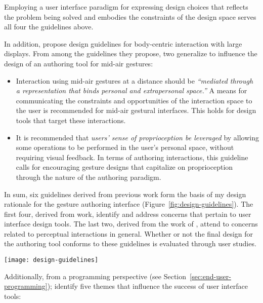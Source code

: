 Employing a user interface paradigm for expressing design choices that reflects the problem being solved and embodies the constraints of the design space \parencite{Norman:1993} serves all four the guidelines above.

In addition, \textcite{Shoemaker:2010} propose design guidelines for body-centric interaction with large displays. From among the guidelines they propose, two generalize to influence the design of an authoring tool for mid-air gestures:

\begin{itemize}
\item Interaction using mid-air gestures at a distance should be \emph{“mediated through a representation that binds personal and extrapersonal space.”} A means for communicating the constraints and opportunities of the interaction space to the user is recommended for mid-air gestural interfaces. This holds for design tools that target these interactions.
\item It is recommended that \emph{users’ sense of proprioception be leveraged} by allowing some operations to be performed in the user’s personal space, without requiring visual feedback. In terms of authoring interactions, this guideline calls for encouraging gesture designs that capitalize on proprioception through the nature of the authoring paradigm.
\end{itemize}

In sum, six guidelines derived from previous work form the basis of my design rationale for the gesture authoring interface (Figure~\ref{fig:design-guidelines}). The first four, derived from  work, identify and address concerns that pertain to user interface design tools. The last two, derived from the work of \textcite{Shoemaker:2010}, attend to concerns related to perceptual interactions in general. Whether or not the final design for the authoring tool conforms to these guidelines is evaluated through user studies.

\begin{SCfigure}[\sidecaptionrelwidth][ht]
\centering
\texttt{[image: design-guidelines]}
\caption{Guidelines derived from the literature formed the basis of the design rationale for a gesture authoring tool.}
\label{fig:design-guidelines}
\end{SCfigure}

Additionally, from a programming perspective (see Section~\ref{sec:end-user-programming}); \textcite{Myers:2000} identify five themes that influence the success of user interface tools:

